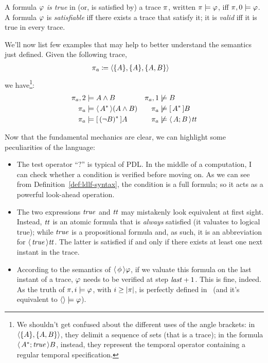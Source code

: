\begin{definition}
	A formula $\varphi$ \emph{is true} in (or, is satisfied by) a trace
	$\pi$, written ${\pi \models \varphi}$, iff $\pi, 0 \models
	\varphi$. A formula $\varphi$ is \emph{satisfiable} iff there exists a
	trace that satisfy it; it is \emph{valid} iff it is true in every trace.
\end{definition}

\begin{example}
	We'll now list few examples that may help to better understand the semantics
	just defined. Given the following trace,
	\begin{align*}
		\pi_a &\coloneqq \langle \{A\}, \{A\}, \{A, B\} \rangle
	\end{align*}
	we have\footnote{We shouldn't get confused about the different uses of the
	angle brackets: in $\langle \{A\}, \{A, B\} \rangle$, they delimit a
	sequence of sets (that is a trace); in the formula $\langle\, {A^*; \text{\textit{true}}} \,\rangle B$,
	instead, they represent the temporal operator containing a regular temporal
	specification.}:
	\begin{align*}
		\pi_a, 2 &\models A \land B &
		\pi_a, 1 &\not\models B\\
		\pi_a &\models \langle\, {A^*} \,\rangle(A \land B) &
		\pi_a &\not\models [\, {A^*} \,]B \\
		\pi_a &\models [\, {(\neg B)^*} \,]A &
		\pi_a &\not\models \langle\, {A; B} \,\rangle\text{\textit{tt}}
	\end{align*}
\end{example}

Now that the fundamental mechanics are clear, we can highlight some
peculiarities of the language:
\begin{itemize}
	\item The test operator ``$?$'' is typical of PDL. In the middle of a
		\re{} computation, I can check whether a condition is verified before
		moving on. As we can see from Definition~\ref{def:ldlf-syntax}, the
		condition is a full \ldl{} formula; so it acts as a powerful look-ahead
		operation.
	\item The two expressions $\text{\textit{true}}$ and $\text{\textit{tt}}$ may mistakenly look equivalent
		at first sight. Instead, $\text{\textit{tt}}$ is an atomic formula that is \emph{always}
		satisfied (it valuates to logical true); while $\text{\textit{true}}$ is a propositional
		formula and, as such, it is an abbreviation for $\langle\, {\text{\textit{true}}} \,\rangle\text{\textit{tt}}$.
		The latter is satisfied if and only if there exists at least one next
		instant in the trace.
	\item According to the semantics of $\langle\, {\phi} \,\rangle\varphi$, if we
		valuate this formula on the last instant of a trace, $\varphi$ needs to
		be verified at step $\text{\textit{last}}+1$. This is fine, indeed. As the truth
		of $\pi, i \models \varphi$, with $i \ge \lvert\pi\rvert$, is perfectly
		defined in~\ldl{} (and it's equivalent to $\langle \rangle \models
		\varphi$).
\end{itemize}

